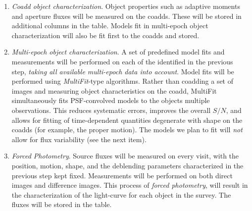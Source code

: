 \documentclass[SE,lsstdraft,toc]{lsstdoc}
\newcommand{\marginreq}[1]{\marginpar{\hspace{0pt}\tiny #1}}
\newcommand{\dmreq}[1]{\marginreq{DMS-REQ-#1}}
\begin{document}
\begin{enumerate}
catalogs\footnote{Note that \Sources are not considered when generating the \Object list (given the large
number of visits in each band, the false positives close to the faint end would increase the complexity of
association and deblending algorithms). It is possible for intermittent sources that are detected just above
the faint detection limit of single visits to be undetected in coaddds, and thus to not have a matching \Object.
To enable easy identification of such \Sources, the nearest \Object associated with each \Source, if any, will be recorded.}.\dmreq{0034}

    The deblender will make use of all information available at this stage, including the knowledge of peak positions, bands, time, time variability (from Level 1), Galactic longitude and latitude, etc. The output of this stage is a list of uncharacterized \Objects\footnote{Depending on the exact implementation of the deblender, this stage may also attach significant metadata (eg, deblended footprints and pixel-weight maps) to each deblended \Object record.}.
    \item \emph{Coadd object characterization}.  Object properties such as adaptive moments and aperture fluxes will be measured on the coadds.  These will be stored in additional columns in the \Object table.  Models fit in multi-epoch object characterization will also be fit first to the coadds and stored. \dmreq{0276}
    \item \emph{Multi-epoch object characterization}. A set of predefined model fits and measurements will be performed on each of the \Objects identified in the previous step, \textit{taking all available multi-epoch data into account}. Model fits will be performed using \emph{MultiFit}-type algorithms. Rather than coadding a set of images and measuring object characteristics on the coadd, MultiFit simultaneously fits PSF-convolved models to the objects multiple observations. This reduces systematic errors, improves the overall $S/N$, and allows for fitting of time-dependent quantities degenerate with shape on the coadds (for example, the proper motion). The models we plan to fit will \emph{not} allow for flux variability (see the next item). \dmreq{0275}
    \item \emph{Forced Photometry}. Source fluxes will be measured on every visit, with the position, motion, shape, and the deblending parameters characterized in the previous step kept fixed.
Measurements will be performed on both direct images and difference images.
This process of \emph{forced photometry}, will result in the characterization of the light-curve for each object in the survey. The fluxes will be stored in the \ForcedSource table.\dmreq{0268}
\end{enumerate}
\end{document}
